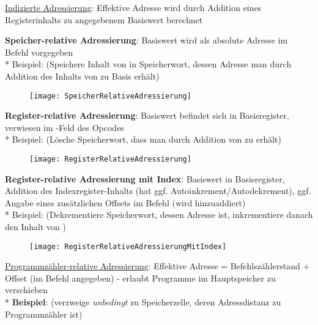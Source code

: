 \begin{items}
	\item \underline{Indizierte Adressierung}: Effektive Adresse wird durch Addition eines Registerinhalts zu angegebenem Basiswert berechnet
	\begin{enumeration}
		\item \textbf{Speicher-relative Adressierung}: Basiswert wird als absolute Adresse im Befehl vorgegeben \\* Beispiel:  (Speichere Inhalt von  in Speicherwort, dessen Adresse man durch Addition des Inhalts von  zu Basis  erhält)
		\begin{figure}[H]
		  \centering
		  \texttt{[image: SpeicherRelativeAdressierung]}
		  \label{SpeicherRelativeAdressierung}
		\end{figure}
		\item \textbf{Register-relative Adressierung}: Basiswert befindet sich in Basisregister, verwiesen im -Feld des Opcodes \\* Beispiel:  (Lösche Speicherwort, dass man durch Addition von  zu  erhält)
		\begin{figure}[H]
		  \centering
		  \texttt{[image: RegisterRelativeAdressierung]}
		  \label{RegisterRelativeAdressierung}
		\end{figure}
		\item \textbf{Register-relative Adressierung mit Index}: Basiswert in Basisregister, Addition des Indexregister-Inhalts (hat ggf. Autoinkrement/Autodekrement), ggf. Angabe eines zusätzlichen Offsets im Befehl (wird hinzuaddiert) \\* Beispiel:  (Dekrementiere Speicherwort, dessen Adresse  ist, inkrementiere danach den Inhalt von )
		\begin{figure}[H]
		  \centering
		  \texttt{[image: RegisterRelativeAdressierungMitIndex]}
		  \label{RegisterRelativeAdressierungMitIndex}
		\end{figure}
	\end{enumeration}

	\item \underline{Programmzähler-relative Adressierung}: Effektive Adresse = Befehlszählerstand + Offset (im Befehl angegeben) - erlaubt Programme im Hauptspeicher zu verschieben \\* \textbf{Beispiel}:  (verzweige \emph{unbedingt} zu Speicherzelle, deren Adressdistanz zu Programmzähler  ist)
\end{items}